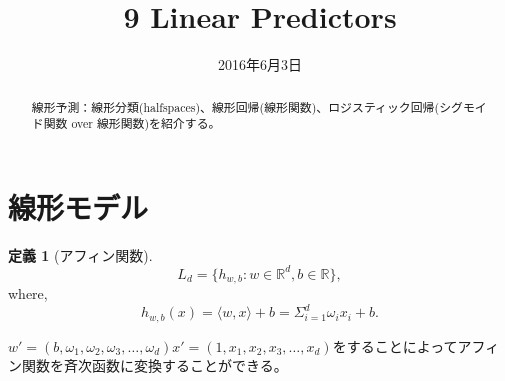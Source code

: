 \documentclass{jarticle}
\title{9 Linear Predictors}
\date{2016年6月3日}
\theoremstyle{definition}
\newtheorem{defi}[thm]{定義}
\begin{document}
\maketitle
\begin{abstract}
線形予測：線形分類(halfspaces)、線形回帰(線形関数)、ロジスティック回帰(シグモイド関数 over 線形関数)を紹介する。
\end{abstract}

\section{線形モデル}
\begin{defi}[アフィン関数]
\begin{equation}
L_d = \{ h_{w,b}:w \in \mathbb{R}^d , b \in \mathbb{R} \}, 
\end{equation}
where, 
\begin{equation}
h_{w,b}(x) = \langle w,x \rangle + b = \Sigma_{i=1}^d \omega_ix_i + b.
\end{equation}
\end{defi}
$w' = (b,\omega_1,\omega_2,\omega_3,\dots,\omega_d) x'=(1,x_1,x_2,x_3,\dots,x_d)$をすることによってアフィン関数を斉次函数に変換することができる。
\end{document}
